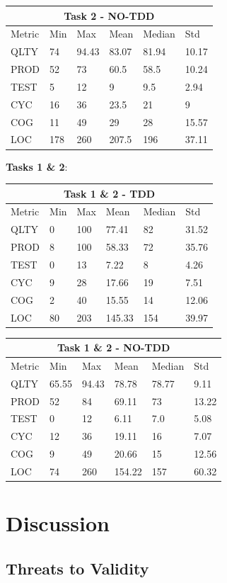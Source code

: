 \noindent
\begin{tabular}{ |p{2cm}||p{1.6cm}|p{1.6cm}|p{1.6cm}|p{1.6cm}|p{1.6cm}|}
    \hline
        \multicolumn{6}{|c|}{Task 2 - NO-TDD} \\
    \hline
        Metric & Min & Max & Mean & Median & Std\\
    \hline
        QLTY & 74 & 94.43 & 83.07 & 81.94 & 10.17 \\
        PROD & 52 & 73 & 60.5 & 58.5 & 10.24 \\
        TEST & 5 & 12 & 9 & 9.5 & 2.94 \\
        CYC & 16 & 36 & 23.5 & 21 & 9 \\
        COG & 11 & 49 & 29 & 28 & 15.57 \\
        LOC & 178 & 260 & 207.5 & 196 & 37.11 \\
    \hline
\end{tabular}

\textbf{Tasks 1 \& 2}:

\noindent
\begin{tabular}{ |p{2cm}||p{1.6cm}|p{1.6cm}|p{1.6cm}|p{1.6cm}|p{1.6cm}|}
    \hline
        \multicolumn{6}{|c|}{Task 1 \& 2 - TDD} \\
    \hline
        Metric & Min & Max & Mean & Median & Std\\
    \hline
        QLTY & 0 & 100 & 77.41 & 82 & 31.52 \\
        PROD & 8 & 100 & 58.33 & 72 & 35.76 \\
        TEST & 0 & 13 & 7.22 & 8 & 4.26 \\
        CYC & 9 & 28 & 17.66 & 19 & 7.51 \\
        COG & 2 & 40 & 15.55 & 14 & 12.06 \\
        LOC & 80 & 203 & 145.33 & 154 & 39.97 \\
    \hline
\end{tabular}

\noindent
\begin{tabular}{ |p{2cm}||p{1.6cm}|p{1.6cm}|p{1.6cm}|p{1.6cm}|p{1.6cm}|}
    \hline
        \multicolumn{6}{|c|}{Task 1 \& 2 - NO-TDD} \\
    \hline
        Metric & Min & Max & Mean & Median & Std\\
    \hline
        QLTY & 65.55 & 94.43 & 78.78 & 78.77 & 9.11 \\
        PROD & 52 & 84 & 69.11 & 73 & 13.22 \\
        TEST & 0 & 12 & 6.11 & 7.0 & 5.08 \\
        CYC & 12 & 36 & 19.11 & 16 & 7.07 \\
        COG & 9 & 49 & 20.66 & 15 & 12.56 \\
        LOC & 74 & 260 & 154.22 & 157 & 60.32 \\
    \hline
\end{tabular}


\section{Discussion}
\subsection{Threats to Validity}